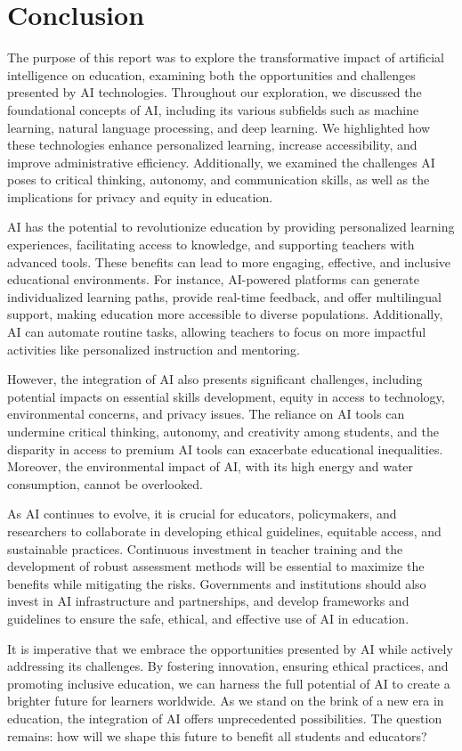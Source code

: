 \documentclass{article}
\begin{document}
\newpage

\section{Conclusion}
The purpose of this report was to explore the transformative impact of artificial intelligence on education, examining both the opportunities and challenges presented by AI technologies. Throughout our exploration, we discussed the foundational concepts of AI, including its various subfields such as machine learning, natural language processing, and deep learning. We highlighted how these technologies enhance personalized learning, increase accessibility, and improve administrative efficiency. Additionally, we examined the challenges AI poses to critical thinking, autonomy, and communication skills, as well as the implications for privacy and equity in education.

AI has the potential to revolutionize education by providing personalized learning experiences, facilitating access to knowledge, and supporting teachers with advanced tools. These benefits can lead to more engaging, effective, and inclusive educational environments. For instance, AI-powered platforms can generate individualized learning paths, provide real-time feedback, and offer multilingual support, making education more accessible to diverse populations. Additionally, AI can automate routine tasks, allowing teachers to focus on more impactful activities like personalized instruction and mentoring.

However, the integration of AI also presents significant challenges, including potential impacts on essential skills development, equity in access to technology, environmental concerns, and privacy issues. The reliance on AI tools can undermine critical thinking, autonomy, and creativity among students, and the disparity in access to premium AI tools can exacerbate educational inequalities. Moreover, the environmental impact of AI, with its high energy and water consumption, cannot be overlooked.

As AI continues to evolve, it is crucial for educators, policymakers, and researchers to collaborate in developing ethical guidelines, equitable access, and sustainable practices. Continuous investment in teacher training and the development of robust assessment methods will be essential to maximize the benefits while mitigating the risks. Governments and institutions should also invest in AI infrastructure and partnerships, and develop frameworks and guidelines to ensure the safe, ethical, and effective use of AI in education.

It is imperative that we embrace the opportunities presented by AI while actively addressing its challenges. By fostering innovation, ensuring ethical practices, and promoting inclusive education, we can harness the full potential of AI to create a brighter future for learners worldwide. As we stand on the brink of a new era in education, the integration of AI offers unprecedented possibilities. The question remains: how will we shape this future to benefit all students and educators?



\newpage



\end{document}
